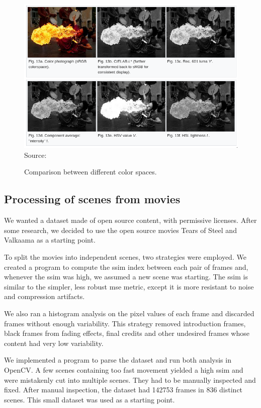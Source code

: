 \documentclass[12pt,openright,oneside,a4paper,english, brazilian]{abntex2}
\begin{document}
\begin{otherlanguage}{english}
\begin{figure}[!htb]
\centering
\caption{Comparison between different color spaces.}
\includegraphics[width=\textwidth]{Colorspaces}
Source: \cite{wiki_HSV}
\label{hsl_hsv}
\end{figure}

\subsection{Processing of scenes from movies}

We wanted a dataset made of open source content, with permissive licenses. After some research, we decided to use the open source movies Tears of Steel \cite{tears_of_steel_movie} and Valkaama \cite{valkaama_movie} as a starting point.

To split the movies into independent scenes, two strategies were employed. We created a program to compute the \acrfull{ssim} index between each pair of frames and, whenever the \acrshort{ssim} was high, we assumed a new scene was starting. The \acrshort{ssim} is similar to the simpler, less robust \acrfull{mse} metric, except it is more resistant to noise and compression artifacts.

We also ran a histogram analysis on the pixel values of each frame and discarded frames without enough variability. This strategy removed introduction frames, black frames from fading effects, final credits and other undesired frames whose content had very low variability.

We implemented a program to parse the dataset and run both analysis in OpenCV. A few scenes containing too fast movement yielded a high \acrshort{ssim} and were mistakenly cut into multiple scenes. They had to be manually inspected and fixed. After manual inspection, the dataset had 142753 frames in 836 distinct scenes. This small dataset was used as a starting point.


\end{otherlanguage}
\end{document}
